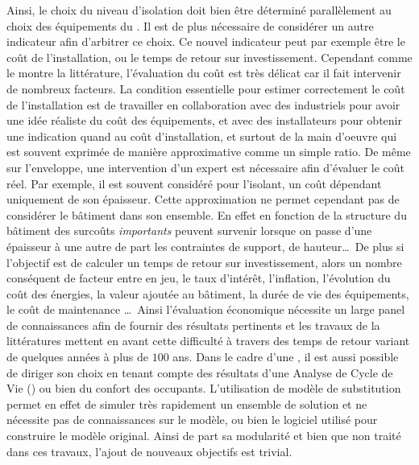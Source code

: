 Ainsi, le choix du niveau d’isolation doit bien être déterminé parallèlement au
choix des équipements du . Il est de plus nécessaire de considérer un
autre indicateur afin d’arbitrer ce choix. Ce nouvel indicateur peut par exemple
être le coût de l’installation, ou le temps de retour sur investissement.
Cependant comme le montre la littérature, l’évaluation du coût est très délicat
car il fait intervenir de nombreux facteurs. La condition essentielle pour estimer
correctement le coût de l’installation est de travailler en collaboration avec
des industriels pour avoir une idée réaliste du coût des équipements, et avec
des installateurs pour obtenir une indication quand au coût d’installation,
et surtout de la main d’oeuvre qui est souvent exprimée de manière approximative comme un simple
ratio. De même sur l’enveloppe, une intervention d’un expert est nécessaire afin
d’évaluer le coût réel. Par exemple, il est souvent considéré pour l’isolant, un coût
dépendant uniquement de son épaisseur. Cette approximation ne permet cependant pas
de considérer le bâtiment dans son ensemble. En effet en fonction
de la structure du bâtiment des surcoûts \emph{importants} peuvent survenir lorsque on passe
d’une épaisseur à une autre de part les contraintes de support, de hauteur\dots\ De
plus si l’objectif est de calculer un temps de retour
sur investissement, alors un nombre conséquent de facteur entre en jeu, le taux
d’intérêt, l’inflation, l’évolution du coût des énergies, la valeur ajoutée au bâtiment,
la durée de vie des équipements, le coût de maintenance
\dots\ Ainsi l’évaluation économique nécessite un large panel de connaissances
afin de fournir des résultats pertinents et les travaux de la littératures mettent
en avant cette difficulté à travers des temps de retour variant de quelques années
à plus de $100$ ans.
Dans le cadre d’une , il est aussi possible de diriger son choix en tenant
compte des résultats d’une Analyse de Cycle de Vie () ou bien du confort des occupants.
L’utilisation de modèle de substitution permet en effet de simuler très rapidement
un ensemble de solution et ne nécessite pas de connaissances sur le modèle, ou bien le
logiciel utilisé pour construire le modèle original. Ainsi de part sa modularité
et bien que non traité dans ces travaux, l’ajout de nouveaux objectifs est trivial.


